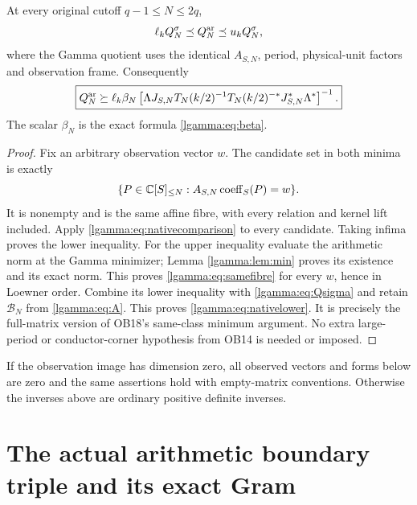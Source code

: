 \begin{lgammatheorem}\label{lgamma:thm:nativelower}
At every original cutoff $q-1\le N\le2q$,
\begin{equation}\label{lgamma:eq:samefibre}
 \ell_kQ_N^\sigma\preceq Q_N^{\rm ar}\preceq u_kQ_N^\sigma,
\end{equation}
where the Gamma quotient uses the identical $A_{S,N}$, period,
physical-unit factors and observation frame.  Consequently
\begin{equation}\label{lgamma:eq:nativelower}
 \boxed{Q_N^{\rm ar}\succeq
 \ell_k\beta_N\left[
 \Lambda J_{S,N}T_N(k/2)^{-1}T_N(k/2)^{-*}J_{S,N}^*\Lambda^*
 \right]^{-1}.}
\end{equation}
The scalar $\beta_N$ is the exact formula \eqref{lgamma:eq:beta}.
\end{lgammatheorem}
\begin{proof}
Fix an arbitrary observation vector $w$.  The candidate set in both
minima is exactly
\[
 \{P\in\mathbb C[S]_{\le N}:A_{S,N}\operatorname{coeff}_S(P)=w\}.
\]
It is nonempty and is the same affine fibre, with every relation and
kernel lift included.  Apply \eqref{lgamma:eq:nativecomparison} to every
candidate.  Taking infima proves the lower inequality.  For the upper
inequality evaluate the arithmetic norm at the Gamma minimizer;
Lemma \ref{lgamma:lem:min} proves its existence and its exact norm.  This
proves \eqref{lgamma:eq:samefibre} for every $w$, hence in Loewner order.
Combine its lower inequality with \eqref{lgamma:eq:Qsigma} and retain
$\mathcal B_N$ from \eqref{lgamma:eq:A}.  This proves \eqref{lgamma:eq:nativelower}.
It is precisely the full-matrix version of OB18's same-class minimum
argument.  No extra large-period or conductor-corner hypothesis from
OB14 is needed or imposed.
\end{proof}

If the observation image has dimension zero, all observed vectors and
forms below are zero and the same assertions hold with empty-matrix
conventions.  Otherwise the inverses above are ordinary positive
definite inverses.

\section{The actual arithmetic boundary triple and its exact Gram}

